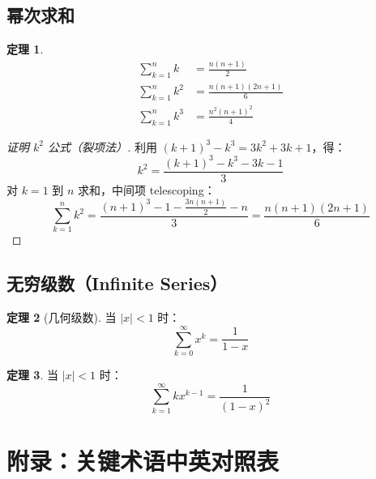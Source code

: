 \documentclass[UTF8,11pt,a4paper]{ctexbook}   %
\theoremstyle{definition}
\newtheorem{theorem}{定理}[section]
\begin{document}
\subsection{幂次求和}

\begin{theorem}
\begin{align*}
\sum_{k=1}^{n} k &= \frac{n(n+1)}{2} \\[0.5em]
\sum_{k=1}^{n} k^2 &= \frac{n(n+1)(2n+1)}{6} \\[0.5em]
\sum_{k=1}^{n} k^3 &= \frac{n^2(n+1)^2}{4}
\end{align*}
\end{theorem}

\begin{proof}[证明 $k^2$ 公式（裂项法）]
利用 $(k+1)^3 - k^3 = 3k^2 + 3k + 1$，得：
\[
k^2 = \frac{(k+1)^3 - k^3 - 3k - 1}{3}
\]
对 $k=1$ 到 $n$ 求和，中间项 telescoping：
\[
\sum_{k=1}^{n} k^2 = \frac{(n+1)^3 - 1 - \frac{3n(n+1)}{2} - n}{3} = \frac{n(n+1)(2n+1)}{6}
\]
\end{proof}

\subsection{无穷级数（Infinite Series）}

\begin{theorem}[几何级数]
当 $|x| < 1$ 时：
\[
\sum_{k=0}^{\infty} x^k = \frac{1}{1-x}
\]
\end{theorem}

\begin{theorem}
当 $|x| < 1$ 时：
\[
\sum_{k=1}^{\infty} kx^{k-1} = \frac{1}{(1-x)^2}
\]
\end{theorem}

\newpage
\section*{附录：关键术语中英对照表}
\end{document}
